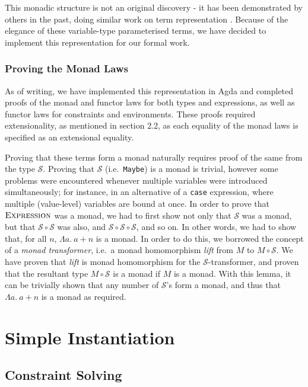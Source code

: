 \documentclass[a4paper]{jfp}
\begin{document}
This monadic structure is not an original discovery - it has been demonstrated by others in the past, doing similar work on term representation \cite{Bird:1999:DBN:968699.968702, Bellegarde:1994:SFM:202774.202788}. Because of the elegance of these variable-type parameterised terms, we have decided to implement this representation for our formal work. 

\subsubsection*{Proving the Monad Laws}

As of writing, we have implemented this representation in Agda and completed proofs of the monad and functor laws for both types and expressions, as well as functor laws for constraints and environments. These proofs required extensionality, as mentioned in section 2.2, as each equality of the monad laws is specified as an extensional equality.

Proving that these terms form a monad naturally requires proof of the same from the type $\mathcal{S}$. Proving that $\mathcal{S}$ (i.e.\ {\tt Maybe}) is a monad is trivial, however some problems were encountered whenever multiple variables were introduced simultaneously; for instance, in an alternative of a {\tt case} expression, where multiple (value-level) variables are bound at once. In order to prove that $\textsc{Expression}$ was a monad, we had to first show not only that $\mathcal{S}$ was a monad, but that $\mathcal{S} \circ \mathcal{S}$ was also, and $\mathcal{S} \circ \mathcal{S} \circ \mathcal{S}$, and so on. In other words, we had to show that, for all $n$, $\Lambda a.\ a + n$ is a monad. In order to do this, we borrowed the concept of a \emph{monad transformer}, i.e.\ a monad homomorphism \emph{lift} from $M$ to $M \circ \mathcal{S}$. We have proven that \emph{lift} is monad homomorphism for the $\mathcal{S}$-transformer, and proven that the resultant type $M \circ \mathcal{S}$ is a monad if $M$ is a monad. With this lemma, it can be trivially shown that any number of $\mathcal{S}$'s form a monad, and thus that $\Lambda a.\ a + n$ is a monad as required.

\section{Simple Instantiation}

\subsection{Constraint Solving}
\end{document}
